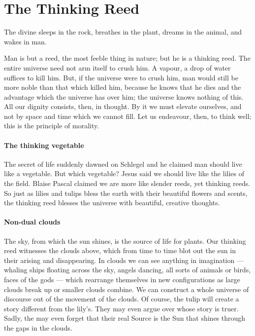 \section{The Thinking Reed}

\begin{quotex}
The divine sleeps in the rock, breathes in the plant, dreams in the animal, and wakes in man.
\end{quotex}


\begin{quotex}
Man is but a reed, the most feeble thing in nature; but he is a thinking reed. The entire universe need not arm itself to crush him. A vapour, a drop of water suffices to kill him. But, if the universe were to crush him, man would still be more noble than that which killed him, because he knows that he dies and the advantage which the universe has over him; the universe knows nothing of this. All our dignity consists, then, in thought. By it we must elevate ourselves, and not by space and time which we cannot fill. Let us endeavour, then, to think well; this is the principle of morality.
\end{quotex}


\paragraph{The thinking vegetable}

The secret of life suddenly dawned on Schlegel and he claimed man should live like a vegetable. But which vegetable? Jesus said we should live like the lilies of the field. Blaise Pascal claimed we are more like slender reeds, yet thinking reeds. So just as lilies and tulips bless the earth with their beautiful flowers and scents, the thinking reed blesses the universe with beautiful, creative thoughts.

\paragraph{Non-dual clouds}


The sky, from which the sun shines, is the source of life for plants. Our thinking reed witnesses the clouds above, which from time to time blot out the sun in their arising and disappearing. In clouds we can see anything in imagination --- whaling ships floating across the sky, angels dancing, all sorts of animals or birds, faces of the gods --- which rearrange themselves in new configurations as large clouds break up or smaller clouds combine. We can construct a whole universe of discourse out of the movement of the clouds. Of course, the tulip will create a story different from the lily's. They may even argue over whose story is truer. Sadly, the may even forget that their real Source is the Sun that shines through the gaps in the clouds.



